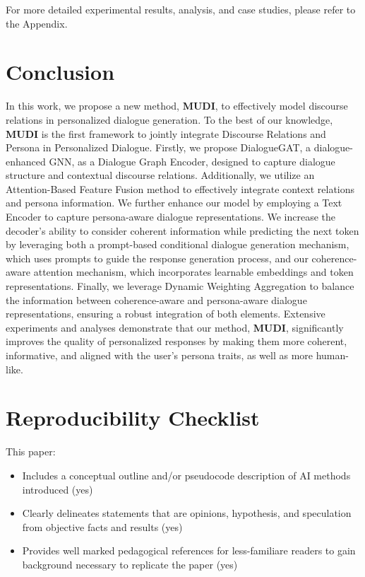 \documentclass[letterpaper]{article} %
\begin{document}
For more detailed experimental results, analysis, and case studies, please refer to the Appendix.

\section{Conclusion}
In this work, we propose a new method, \textbf{MUDI}, to effectively model discourse relations in personalized dialogue generation. To the best of our knowledge, \textbf{MUDI} is the first framework to jointly integrate Discourse Relations and Persona in Personalized Dialogue. Firstly, we propose DialogueGAT, a dialogue-enhanced GNN, as a Dialogue Graph Encoder, designed to capture dialogue structure and contextual discourse relations. Additionally, we utilize an Attention-Based Feature Fusion method to effectively integrate context relations and persona information. We further enhance our model by employing a Text Encoder to capture persona-aware dialogue representations. We increase the decoder's ability to consider coherent information while predicting the next token by leveraging both a prompt-based conditional dialogue generation mechanism, which uses prompts to guide the response generation process, and our coherence-aware attention mechanism, which incorporates learnable embeddings and token representations. Finally, we leverage Dynamic Weighting Aggregation to balance the information between coherence-aware and persona-aware dialogue representations, ensuring a robust integration of both elements. Extensive experiments and analyses demonstrate that our method, \textbf{MUDI}, significantly improves the quality of personalized responses by making them more coherent, informative, and aligned with the user's persona traits, as well as more human-like.



\section{Reproducibility Checklist}

This paper:

\begin{itemize}
    \item Includes a conceptual outline and/or pseudocode description of AI methods introduced (yes)
    \item Clearly delineates statements that are opinions, hypothesis, and speculation from objective facts and results (yes)
    \item Provides well marked pedagogical references for less-familiare readers to gain background necessary to replicate the paper (yes)
\end{itemize}
\end{document}
